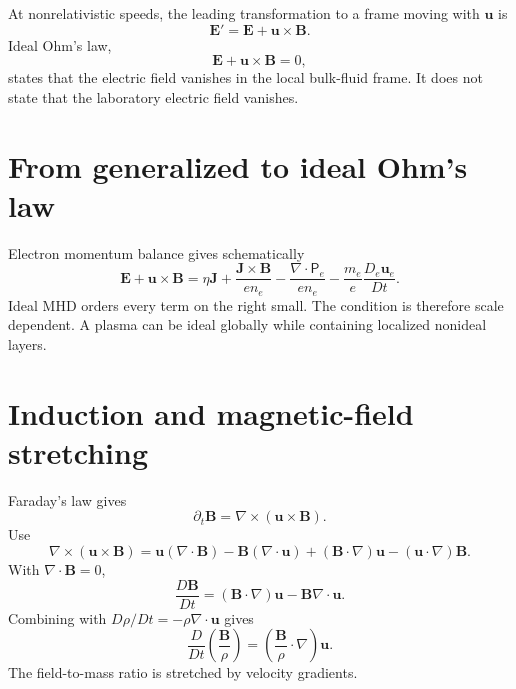 \documentclass[11pt]{article}
\begin{document}
At nonrelativistic speeds, the leading transformation to a frame moving with $\mathbf u$ is
\begin{equation}
\mathbf E'=\mathbf E+\mathbf u\times\mathbf B.
\end{equation}
Ideal Ohm's law,
\begin{equation}
\boxed{\mathbf E+\mathbf u\times\mathbf B=0},
\end{equation}
states that the electric field vanishes in the local bulk-fluid frame. It does not state that the laboratory electric field vanishes.


\section{From generalized to ideal Ohm's law}

Electron momentum balance gives schematically
\begin{equation}
\mathbf E+\mathbf u\times\mathbf B
=\eta\mathbf J+\frac{\mathbf J\times\mathbf B}{en_e}
-\frac{\nabla\cdot\mathsf P_e}{en_e}
-\frac{m_e}{e}\frac{D_e\mathbf u_e}{Dt}.
\end{equation}
Ideal MHD orders every term on the right small. The condition is therefore scale dependent. A plasma can be ideal globally while containing localized nonideal layers.


\section{Induction and magnetic-field stretching}

Faraday's law gives
\begin{equation}
\partial_t\mathbf B=\nabla\times(\mathbf u\times\mathbf B).
\end{equation}
Use
\begin{equation}
\nabla\times(\mathbf u\times\mathbf B)=
\mathbf u(\nabla\cdot\mathbf B)-\mathbf B(\nabla\cdot\mathbf u)
+(\mathbf B\cdot\nabla)\mathbf u-(\mathbf u\cdot\nabla)\mathbf B.
\end{equation}
With $\nabla\cdot\mathbf B=0$,
\begin{equation}
\frac{D\mathbf B}{Dt}=(\mathbf B\cdot\nabla)\mathbf u-\mathbf B\nabla\cdot\mathbf u.
\end{equation}
Combining with $D\rho/Dt=-\rho\nabla\cdot\mathbf u$ gives
\begin{equation}
\boxed{\frac{D}{Dt}\left(\frac{\mathbf B}{\rho}\right)
=\left(\frac{\mathbf B}{\rho}\cdot\nabla\right)\mathbf u}.
\end{equation}
The field-to-mass ratio is stretched by velocity gradients.
\end{document}

